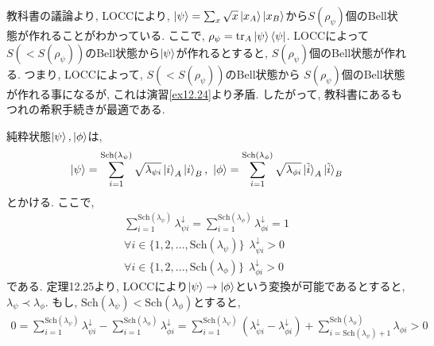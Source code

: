\begin{ex}
    \label{ex12.22}

\end{ex}

\begin{ex}
    \label{ex12.23}
    教科書の議論より, LOCCにより, $\ket{\psi} = \sum_x \sqrt{x} \ket{x_A}\ket{x_B}$から$S(\rho_\psi)$個のBell状態が作れることがわかっている. ここで, $\rho_\psi = \mathrm{tr}_A \ket{\psi}\bra{\psi}$.
    LOCCによって$S (< S(\rho_\psi))$のBell状態から$\ket{\psi}$が作れるとすると, $S(\rho_\psi)$個のBell状態が作れる. つまり, LOCCによって, $S (< S(\rho_\psi))$のBell状態から $S(\rho_\psi)$個のBell状態が作れる事になるが, これは演習\ref{ex12.24}より矛盾. したがって, 教科書にあるもつれの希釈手続きが最適である.
\end{ex}

\begin{ex}
    \label{ex12.24}
    純粋状態$\ket{\psi}, \ket{\phi}$は,
    \begin{align*}
        \ket{\psi} = \sum_{i=1}^{\mathrm{Sch}(\lambda_\psi)} \sqrt{\lambda_{\psi i}}\ket{i}_A \ket{i}_B , \
        \ket{\phi} = \sum_{i=1}^{\mathrm{Sch}(\lambda_\phi)} \sqrt{\lambda_{\phi i}}\ket{\tilde{i}}_A \ket{\tilde{i}}_B
    \end{align*}
    とかける. ここで,
    \begin{align*}
        \sum_{i=1}^{\mathrm{Sch}(\lambda_\psi)} \lambda_{\psi i}^\downarrow
        = \sum_{i=1}^{\mathrm{Sch}(\lambda_\phi)} \lambda_{\phi i}^\downarrow= 1                     \\
        \forall i \in \{ 1,2, ..., \mathrm{Sch}(\lambda_\psi) \} \ \ \lambda_{\psi i}^\downarrow > 0 \\
        \forall i \in \{ 1,2, ..., \mathrm{Sch}(\lambda_\phi) \} \ \ \lambda_{\phi i}^\downarrow > 0
    \end{align*}
    である.
    定理12.25より, LOCCにより$\ket{\psi} \to \ket{\phi}$という変換が可能であるとすると, $\lambda_\psi \prec \lambda_\phi$. もし, $\mathrm{Sch}(\lambda_\psi) < \mathrm{Sch}({\lambda_\phi})$とすると,
    \begin{align*}
        0 =
        \sum_{i=1}^{\mathrm{Sch}(\lambda_{\psi})} \lambda_{\psi i}^\downarrow
        -
        \sum_{i=1}^{\mathrm{Sch}(\lambda_{\phi})} \lambda_{\phi i}^\downarrow
        =
        \sum_{i=1}^{\mathrm{Sch}(\lambda_{\psi})} ( \lambda_{\psi i}^\downarrow - \lambda_{\phi i}^\downarrow)
        +
        \sum_{i=\mathrm{Sch}(\lambda_{\psi})+1}^{\mathrm{Sch}(\lambda_{\phi})} \lambda_{\phi i}
        > 0

\end{align*}
\end{ex}
